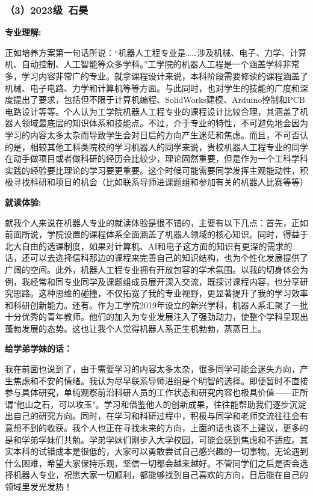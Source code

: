 \documentclass[11pt,oneside]{book}
\begin{document}
\subsubsection{（3）2023级\ 石昊}

\textbf{专业理解:}

正如培养方案第一句话所说：“机器人工程专业是……涉及机械、电子、力学、计算机、自动控制、人工智能等众多学科。”工学院的机器人工程是一个涵盖学科非常多，学习内容非常广的专业。就拿课程设计来说，本科阶段需要修读的课程涵盖了机械、电子电路、力学和计算机等等方面。与此同时，也对学生的技能的广度和深度提出了要求，包括但不限于计算机编程、SolidWorks建模、Arduino控制和PCB电路设计等等。个人认为工学院机器人工程专业的课程设计比较合理，其涵盖了机器人领域最底层的知识体系和技能点。不过，介于专业的特性，不可避免地会因为学习的内容太多太杂而导致学生会对日后的方向产生迷茫和焦虑。而且，不可否认的是，相较其他工科类院校的学习机器人的同学来说，贵校机器人工程专业的同学在动手做项目或者做科研的经历会比较少，理论固然重要，但是作为一个工科学科实践的经验要比理论的学习要更重要。这个时候可能需要同学发挥主观能动性，积极寻找科研和项目的机会（比如联系导师进课题组和参加有关的机器人比赛等等）

\vspace{10pt}

\textbf{就读体验:}

就我个人来说在机器人专业的就读体验是很不错的，主要有以下几点：首先，正如前面所说，学院设置的课程体系全面涵盖了机器人领域的核心知识。同时，得益于北大自由的选课制度，如果对计算机、AI和电子这方面的知识有更深的需求的话，还可以去选择信科那边的课程来完善自己的知识结构，也为个性化发展提供了广阔的空间。此外，机器人工程专业拥有开放包容的学术氛围。以我的切身体会为例，我经常和同专业同学及课题组成员展开深入交流，既探讨课程内容，也分享研究思路。这种思维的碰撞，不仅拓宽了我的专业视野，更显著提升了我的学习效率和科研创新能力。还有。作为工学院2019年设立的新兴学科，机器人系汇聚了一批十分优秀的青年教师。他们的加入为专业发展注入了强劲动力，使整个学科呈现出蓬勃发展的态势。这也让我个人觉得机器人系正生机勃勃，蒸蒸日上。

\vspace{10pt}

\textbf{给学弟学妹的话：}

我在前面也说到了，由于需要学习的内容太多太杂，很多同学可能会迷失方向，产生焦虑和不安的情绪。我认为尽早联系导师进组是个明智的选择。即便暂时不直接参与具体研究，单纯观察前沿科研人员的工作状态和研究内容也极具价值——正所谓"他山之石，可以攻玉"。学习和借鉴他人的创新成果，往往能帮助我们逐步沉淀出自己的研究方向。同时，在学习和科研过程中，积极与同学和老师交流往往会有意想不到的收获。我个人也正在寻找未来的方向，上面的话也谈不上建议，更多的是和学弟学妹们共勉。学弟学妹们刚步入大学校园，可能会感到焦虑和不适应。其实本科的试错成本是很低的，大家可以勇敢尝试自己感兴趣的一切事物。无论遇到什么困难，希望大家保持乐观，坚信一切都会越来越好。不管同学们之后是否会选择机器人专业，祝愿大家一切顺利，都能够找到自己喜欢的方向，日后能在自己的领域里发光发热！
\end{document}
